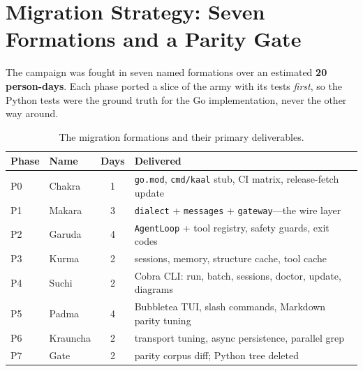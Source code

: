 \documentclass[11pt,a4paper]{article}
\begin{document}
\section{Migration Strategy: Seven Formations and a Parity Gate}

\noindent
The campaign was fought in seven named formations over an estimated \textbf{20 person-days}. Each phase ported a slice of the army with its tests \emph{first}, so the Python tests were the ground truth for the Go implementation, never the other way around.

\begin{table}[ht]
\centering
\small
\begin{tabularx}{\textwidth}{@{}l l c Y@{}}
\toprule
\textbf{Phase} & \textbf{Name} & \textbf{Days} & \textbf{Delivered} \\
\midrule
P0 & Chakra & 1 & \texttt{go.mod}, \texttt{cmd/kaal} stub, CI matrix, release-fetch update \\
P1 & Makara & 3 & \texttt{dialect} + \texttt{messages} + \texttt{gateway}---the wire layer \\
P2 & Garuda & 4 & \texttt{AgentLoop} + tool registry, safety guards, exit codes \\
P3 & Kurma & 2 & sessions, memory, structure cache, tool cache \\
P4 & Suchi & 2 & Cobra CLI: run, batch, sessions, doctor, update, diagrams \\
P5 & Padma & 4 & Bubbletea TUI, slash commands, Markdown parity tuning \\
P6 & Krauncha & 2 & transport tuning, async persistence, parallel grep \\
P7 & Gate & 2 & parity corpus diff; Python tree deleted \\
\bottomrule
\end{tabularx}
\caption{The migration formations and their primary deliverables.}
\label{tab:formations}
\end{table}
\end{document}
